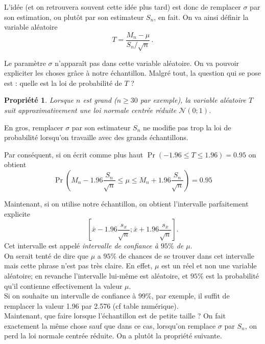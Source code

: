 \documentclass[12pt, a4paper]{book}
\newtheorem{prop}[thm]{Propriété}
\numberwithin{equation}{section}
\begin{document}
L'idée (et on retrouvera souvent cette idée plus tard) est donc de remplacer $\sigma$ par son estimation,
ou plutôt par son estimateur $S_n$, en fait. On va ainsi définir la variable aléatoire
$$
T = \frac{M_n-\mu}{S_n/\sqrt{n}}\,.
$$

Le paramètre $\sigma$ n'apparaît pas dans cette variable aléatoire. On va pouvoir expliciter les choses
gr\^ace à notre échantillon. Malgré tout, la question qui se pose est : quelle est la loi de probabilité de 
$T$ ? 

\begin{prop}
Lorsque $n$ est grand ($n\geq 30$ par exemple), la variable aléatoire $T$ suit approximativement une 
loi normale centrée réduite $\mathcal{N}(0;1)$.
\end{prop}

En gros, remplacer $\sigma$ par son estimateur $S_n$ ne modifie pas trop la loi de probabilité lorsqu'on 
travaille avec des grands échantillons.

Par conséquent, si on écrit comme plus haut 
$\displaystyle  \Pr(-1.96  \leq T \leq  1.96 ) = 0.95$
on obtient 
$$
\Pr\left(M_n -1.96 \frac{S_n}{\sqrt{n}} \leq \mu \leq M_n + 1.96 \frac{S_n}{\sqrt{n}}\right) = 0.95
$$

Maintenant, si on utilise notre échantillon, on obtient l'intervalle parfaitement explicite 
\[ \left[\bar{x} - 1.96 \frac{s_x}{\sqrt{n}} ; \bar{x} + 1.96 \frac{s_x}{\sqrt{n}}\right]. \]
Cet intervalle est appelé {\it intervalle de confiance à $95 \%$ de $\mu$}. \\

On serait tenté de dire que $\mu$ a $95 \%$ de chances de se trouver dans cet intervalle mais cette 
phrase n'est pas très claire. En effet, $\mu$ est un réel et non une variable aléatoire; 
en revanche l'intervalle lui-même est aléatoire, et $95 \%$ est la probabilité qu'il contienne effectivement la valeur $\mu$. \\

Si on souhaite un intervalle de confiance à $99 \%$, par exemple, il suffit de remplacer la valeur
1.96 par 2.576 (cf table numérique). \\

Maintenant, que faire lorsque l'échantillon est de petite taille ? On fait exactement la même chose sauf
que dans ce cas, lorsqu'on remplace $\sigma$ par $S_n$, on perd la loi normale centrée réduite. On a 
plutôt la propriété suivante.
\end{document}

